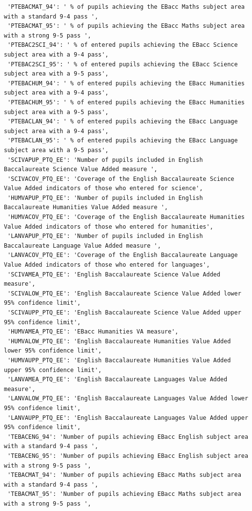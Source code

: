 \documentclass[
  letterpaper,
  DIV=11,
  numbers=noendperiod]{scrartcl}
\begin{document}
\begin{verbatim}
 'PTEBACMAT_94': ' % of pupils achieving the EBacc Maths subject area with a standard 9-4 pass ',
 'PTEBACMAT_95': ' % of pupils achieving the EBacc Maths subject area with a strong 9-5 pass ',
 'PTEBAC2SCI_94': ' % of entered pupils achieving the EBacc Science subject area with a 9-4 pass',
 'PTEBAC2SCI_95': ' % of entered pupils achieving the EBacc Science subject area with a 9-5 pass',
 'PTEBACHUM_94': ' % of entered pupils achieving the EBacc Humanities subject area with a 9-4 pass',
 'PTEBACHUM_95': ' % of entered pupils achieving the EBacc Humanities subject area with a 9-5 pass',
 'PTEBACLAN_94': ' % of entered pupils achieving the EBacc Language subject area with a 9-4 pass',
 'PTEBACLAN_95': ' % of entered pupils achieving the EBacc Language subject area with a 9-5 pass',
 'SCIVAPUP_PTQ_EE': 'Number of pupils included in English Baccalaureate Science Value Added measure ',
 'SCIVACOV_PTQ_EE': 'Coverage of the English Baccalaureate Science Value Added indicators of those who entered for science',
 'HUMVAPUP_PTQ_EE': 'Number of pupils included in English Baccalaureate Humanities Value Added measure ',
 'HUMVACOV_PTQ_EE': 'Coverage of the English Baccalaureate Humanities Value Added indicators of those who entered for humanities',
 'LANVAPUP_PTQ_EE': 'Number of pupils included in English Baccalaureate Language Value Added measure ',
 'LANVACOV_PTQ_EE': 'Coverage of the English Baccalaureate Language Value Added indicators of those who entered for languages',
 'SCIVAMEA_PTQ_EE': 'English Baccalaureate Science Value Added measure',
 'SCIVALOW_PTQ_EE': 'English Baccalaureate Science Value Added lower 95% confidence limit',
 'SCIVAUPP_PTQ_EE': 'English Baccalaureate Science Value Added upper 95% confidence limit',
 'HUMVAMEA_PTQ_EE': 'EBacc Humanities VA measure',
 'HUMVALOW_PTQ_EE': 'English Baccalaureate Humanities Value Added lower 95% confidence limit',
 'HUMVAUPP_PTQ_EE': 'English Baccalaureate Humanities Value Added upper 95% confidence limit',
 'LANVAMEA_PTQ_EE': 'English Baccalaureate Languages Value Added measure',
 'LANVALOW_PTQ_EE': 'English Baccalaureate Languages Value Added lower 95% confidence limit',
 'LANVAUPP_PTQ_EE': 'English Baccalaureate Languages Value Added upper 95% confidence limit',
 'TEBACENG_94': 'Number of pupils achieving EBacc English subject area with a standard 9-4 pass ',
 'TEBACENG_95': 'Number of pupils achieving EBacc English subject area with a strong 9-5 pass ',
 'TEBACMAT_94': 'Number of pupils achieving EBacc Maths subject area with a standard 9-4 pass ',
 'TEBACMAT_95': 'Number of pupils achieving EBacc Maths subject area with a strong 9-5 pass ',

\end{verbatim}
\end{document}
